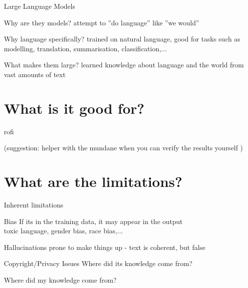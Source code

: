 \documentclass[aspectratio=169,hyperref={unicode}]{beamer}
\begin{document}
\begin{frame}{Large Language Models}
\begin{alertblock}{Why are they models?}
attempt to ''do language'' like ''we would''
\end{alertblock}

\begin{alertblock}{Why language specifically?}
trained on natural language, good for tasks such as modelling, translation, summarisation, classification,...
\end{alertblock}

\begin{alertblock}{What makes them large?}
learned knowledge about language and the world from vast amounts of text
\end{alertblock}

\end{frame}

\section{What is it good for?}

\begin{frame}
	rofi
	
	(suggestion: helper with the mundane when you can verify the results yourself )
\end{frame}

\section{What are the limitations?}

\begin{frame}{Inherent limitations}
\begin{alertblock}{Bias}
If its in the training data, it may appear in the output\\
toxic language, gender bias, race bias,...
\end{alertblock}

\begin{alertblock}{Hallucinations}
prone to make things up - text is coherent, but false	
\end{alertblock}

\begin{alertblock}{Copyright/Privacy Issues}
Where did its knowledge come from?

Where did my knowledge come from?
	
\end{alertblock}

\end{frame}
\end{document}
